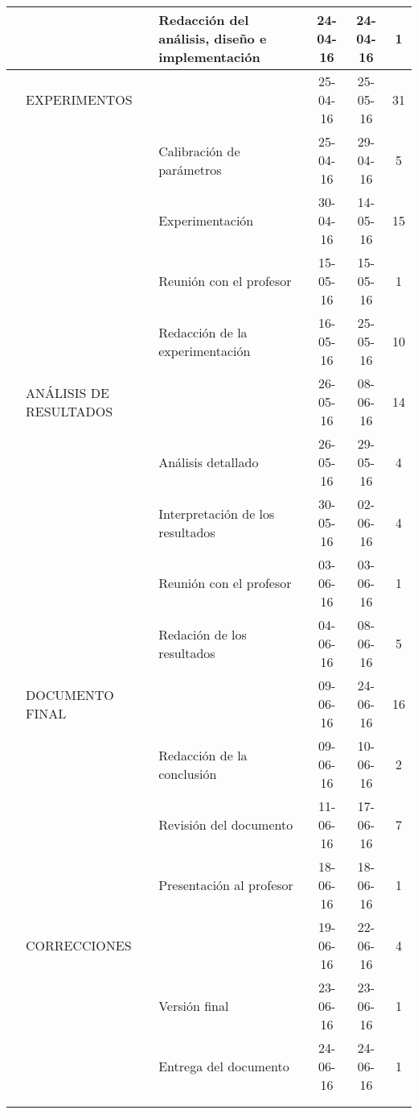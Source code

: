 \begin{table}[H]
{\begin{tabular}{lllccc}
	&							& Redacción del análisis, diseño e implementación	& 24-04-16				& 24-04-16				& 1\\ \hline
	& EXPERIMENTOS				&													& 25-04-16				& 25-05-16				& 31\\
	&							& Calibración de parámetros							& 25-04-16				& 29-04-16				& 5\\
	&							& Experimentación									& 30-04-16				& 14-05-16				& 15\\
	&							& Reunión con el profesor							& 15-05-16				& 15-05-16				& 1\\
	&							& Redacción de la experimentación					& 16-05-16				& 25-05-16				& 10\\ \hline
	& ANÁLISIS DE RESULTADOS	&													& 26-05-16				& 08-06-16				& 14\\
	&							& Análisis detallado								& 26-05-16				& 29-05-16				& 4\\
	&							& Interpretación de los resultados					& 30-05-16				& 02-06-16				& 4\\
	&							& Reunión con el profesor							& 03-06-16				& 03-06-16				& 1\\
	&							& Redación de los resultados						& 04-06-16				& 08-06-16				& 5\\ \hline
	& DOCUMENTO FINAL			&													& 09-06-16				& 24-06-16				& 16\\
	&							& Redacción de la conclusión						& 09-06-16				& 10-06-16				& 2\\
	&							& Revisión del documento							& 11-06-16				& 17-06-16				& 7\\
	&							& Presentación al profesor							& 18-06-16				& 18-06-16				& 1\\ \hline
	& CORRECCIONES				&													& 19-06-16				& 22-06-16				& 4\\
	&							& Versión final										& 23-06-16				& 23-06-16				& 1\\
	&							& Entrega del documento								& 24-06-16				& 24-06-16				& 1\\ \hline
	&							&													& \multicolumn{1}{l}{}	& \multicolumn{1}{l}{}	& \multicolumn{1}{l}{}\\
	&							&													& \multicolumn{1}{l}{}	& \multicolumn{1}{l}{}	& \multicolumn{1}{l}{}
\end{tabular}
}
\end{table}
